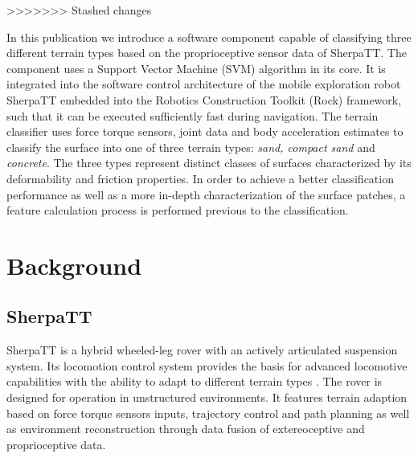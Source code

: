 \documentclass{article}
\begin{document}
>>>>>>> Stashed changes

In this publication we introduce a software component capable of classifying three different terrain types based on the proprioceptive sensor data of SherpaTT. 
The component uses a Support Vector Machine (SVM) algorithm \cite{vapnik1992,cristianini2000} in its core. It is integrated into the software control architecture of the mobile exploration robot SherpaTT embedded into the Robotics Construction Toolkit (Rock) framework, such that it can be executed sufficiently fast during navigation. The terrain classifier uses force torque sensors, joint data and body acceleration estimates to classify the surface into one of three terrain types: \emph{sand, compact sand} and \emph{concrete}.
The three types represent distinct classes of surfaces characterized by its deformability and friction properties. In order to achieve a better classification performance as well as a more in-depth characterization of the surface patches, a feature calculation process is performed previous to the classification. 


\section{Background}


\subsection{SherpaTT}

 SherpaTT is a hybrid wheeled-leg rover with an actively articulated suspension system. Its locomotion control system provides the basis for advanced locomotive capabilities with the ability to adapt to different terrain types \cite{cordes2018}. The rover is designed for operation in unstructured environments. It features terrain adaption based on force torque sensors inputs, trajectory control and path planning as well as environment reconstruction through data fusion of extereoceptive and proprioceptive data.
\end{document}
